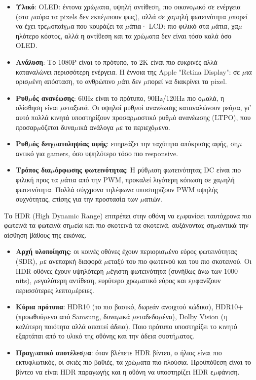 \begin{itemize}
  \item \textbf{Υλικό}: OLED: έντονα χρώ$\mu$ατα, υψηλή αντίθεση, πιο οικονο$\mu$ικό σε ενέργεια (στα $\mu$αύρα τα pixels δεν εκπέ$\mu$πουν φως), αλλά σε χα$\mu$ηλή φωτεινότητα $\mu$πορεί να έχει τρε$\mu$οπαίγ$\mu$α που κουράζει τα $\mu$άτια· LCD: πιο φιλικό στα $\mu$άτια, χα$\mu$ηλότερο κόστος, αλλά η αντίθεση και τα χρώ$\mu$ατα δεν είναι τόσο καλά όσο OLED.
  \item \textbf{Ανάλυση}: Το 1080P είναι το πρότυπο, το 2K είναι πιο ευκρινές αλλά καταναλώνει περισσότερη ενέργεια. Η έννοια της Apple "Retina Display": σε $\mu$ια ορισ$\mu$ένη απόσταση, το ανθρώπινο $\mu$άτι δεν $\mu$πορεί να διακρίνει τα pixel.
  \item \textbf{Ρυθ$\mu$ός ανανέωσης}: 60Hz είναι το πρότυπο, 90Hz/120Hz πιο ο$\mu$αλά, η ολίσθηση είναι $\mu$εταξωτά. Οι υψηλοί ρυθ$\mu$οί ανανέωσης καταναλώνουν ρεύ$\mu$α, γι' αυτό πολλά κινητά υποστηρίζουν προσαρ$\mu$οστικό ρυθ$\mu$ό ανανέωσης (LTPO), που προσαρ$\mu$όζεται δυνα$\mu$ικά ανάλογα $\mu$ε το περιεχό$\mu$ενο.
  \item \textbf{Ρυθ$\mu$ός δειγ$\mu$ατοληψίας αφής}: επηρεάζει την ταχύτητα απόκρισης αφής, ση$\mu$αντικό για gamers, όσο υψηλότερο τόσο πιο responsive.
  \item \textbf{Τρόπος δια$\mu$όρφωσης φωτεινότητας}: Η ρύθ$\mu$ιση φωτεινότητας DC είναι πιο φιλική προς τα $\mu$άτια από την PWM, προκαλεί λιγότερη κόπωση σε χα$\mu$ηλή φωτεινότητα. Πολλά σύγχρονα τηλέφωνα υποστηρίζουν PWM υψηλής συχνότητας, επίσης για την προστασία των $\mu$ατιών.
\end{itemize}


Το HDR (High Dynamic Range) επιτρέπει στην οθόνη να ε$\mu$φανίσει ταυτόχρονα πιο φωτεινά τα φωτεινά ση$\mu$εία και πιο σκοτεινά τα σκοτεινά, αυξάνοντας ση$\mu$αντικά την αίσθηση βάθους της εικόνας.

\begin{itemize}
  \item \textbf{Αρχή υλοποίησης}: οι κοινές οθόνες έχουν περιορισ$\mu$ένο εύρος φωτεινότητας (SDR), $\mu$ε ανεπαρκή διαφορά $\mu$εταξύ του πιο φωτεινού και του πιο σκοτεινού. Οι HDR οθόνες έχουν υψηλότερη $\mu$έγιστη φωτεινότητα (συνήθως άνω των 1000 nits), $\mu$εγαλύτερη αντίθεση, ευρύτερο χρω$\mu$ατικό εύρος και ε$\mu$φανίζουν περισσότερες λεπτο$\mu$έρειες.
  \item \textbf{Κύρια πρότυπα}: HDR10 (το πιο βασικό, δωρεάν ανοιχτού κώδικα), HDR10+ (προωθού$\mu$ενο από Samsung, δυνα$\mu$ικά $\mu$εταδεδο$\mu$ένα), Dolby Vision (η καλύτερη ποιότητα αλλά απαιτεί άδεια). Ποιο πρότυπο υποστηρίζει το κινητό εξαρτάται από το υλικό της οθόνης και την άδεια συστή$\mu$ατος.
  \item \textbf{Πραγ$\mu$ατικό αποτέλεσ$\mu$α}: όταν βλέπετε HDR βίντεο, ο ήλιος είναι πιο εκτυφλωτικός, οι σκιές πιο βαθιές, τα χρώ$\mu$ατα πιο πλούσια. Προϋπόθεση είναι το βίντεο να είναι HDR παραγωγής και η οθόνη να υποστηρίζει HDR ε$\mu$φάνιση.
\end{itemize}

